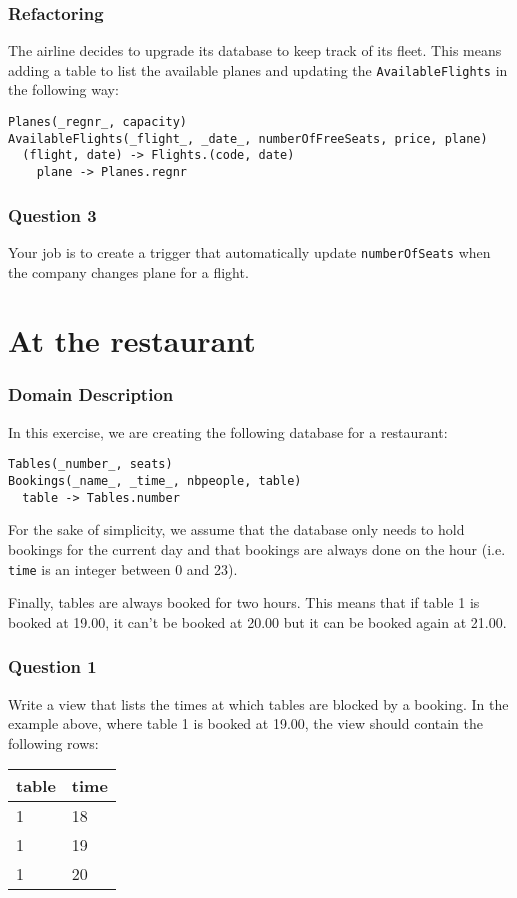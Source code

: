\documentclass{beamer}
\begin{document}
\begin{frame}[fragile]
  \frametitle{Refactoring}
  The airline decides to upgrade its database to keep track of its fleet. This
  means adding a table to list the available planes and updating the
  \texttt{AvailableFlights} in the following way:
\footnotesize
\begin{verbatim}
Planes(_regnr_, capacity)
AvailableFlights(_flight_, _date_, numberOfFreeSeats, price, plane)
  (flight, date) -> Flights.(code, date)
    plane -> Planes.regnr
\end{verbatim}
\normalsize
\end{frame}

\begin{frame}[fragile]
  \frametitle{Question 3}
  Your job is to create a trigger that automatically update
  \verb|numberOfSeats| when the company changes plane for a flight.
\end{frame}


\section{At the restaurant}
\frame{\sectionpage}

\begin{frame}[fragile]
  \frametitle{Domain Description}
In this exercise, we are creating the following database for a
restaurant:

\begin{verbatim}
Tables(_number_, seats)
Bookings(_name_, _time_, nbpeople, table)
  table -> Tables.number
\end{verbatim}

For the sake of simplicity, we assume that the database only needs to
hold bookings for the current day and that bookings are always done on
the hour (i.e. \texttt{time} is an integer between 0 and 23).

Finally, tables are always booked for two hours. This means that if
table 1 is booked at 19.00, it can't be booked at 20.00 but it can be
booked again at 21.00.
\end{frame}

\begin{frame}
  \frametitle{Question 1}
  Write a view that lists the times at which tables are blocked by a booking.
  In the example above, where table 1 is booked at 19.00, the view should
  contain the following rows:
  \begin{center}
    \begin{tabular}{l|l}
      table & time\\
      \hline
      1 & 18\\
      1 & 19\\
      1 & 20\\
    \end{tabular}
  \end{center}
\end{frame}
\end{document}
